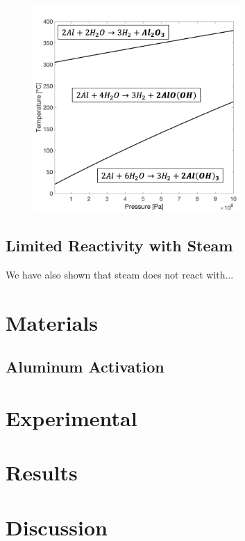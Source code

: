 \documentclass[preprint,12pt,3p]{elsarticle}
\begin{document}
\begin{figure}
  \centering
  \includegraphics[width=0.7\textwidth]{fig/transitions}
  \label{fig:transitions_full}
\end{figure}

\subsection{Limited Reactivity with Steam}

We have also shown that steam does not react with...

\section{Materials}
\label{materials}

\subsection{Aluminum Activation}

\section{Experimental}
\label{experiment}

\section{Results}
\label{results}

\section{Discussion}
\label{discussion}
\end{document}
